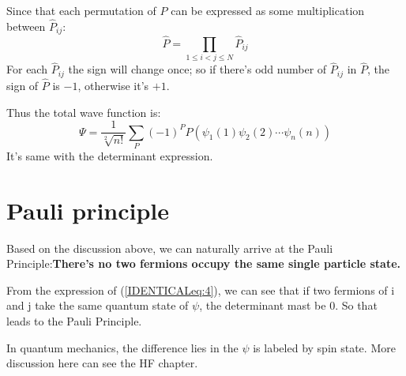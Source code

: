 Since that each permutation of $\hat{P}$ can be expressed as some
multiplication between $\hat{P}_{ij}$:
\begin{equation}\label{}
\hat{P} = \prod_{1\leq i<j\leq N}\hat{P}_{ij}
\end{equation}
For each $\hat{P}_{ij}$ the sign will change once; so if there's odd
number of $\hat{P}_{ij}$ in $\hat{P}$, the sign of $\hat{P}$ is
$-1$, otherwise it's $+1$.

Thus the total wave function is:
\begin{equation}\label{}
\Psi =
\frac{1}{\sqrt[2]{n!}}\sum_{P}(-1)^{P}P(\psi_{1}(1)\psi_{2}(2)\cdots\psi_{n}(n))
\end{equation}
It's same with the determinant expression.

\section{Pauli principle}


Based on the discussion above, we can naturally arrive at the Pauli
Principle:\textbf{There's no two fermions occupy the same single
particle state.}

From the expression of (\ref{IDENTICALeq:4}), we can see that if two
fermions of i and j take the same quantum state of $\psi$, the
determinant mast be $0$. So that leads to the Pauli Principle.

In quantum mechanics, the difference lies in the $\psi$ is labeled
by spin state. More discussion here can see the HF chapter.




